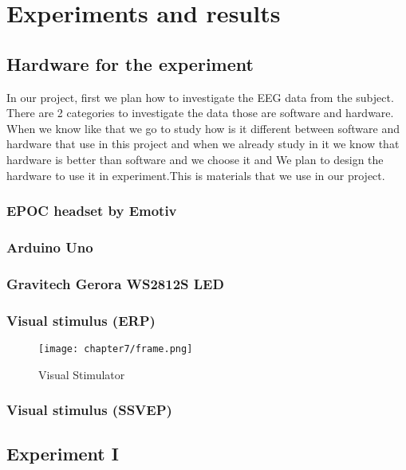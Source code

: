 \chapter{Experiments and results}

\label{ch:Experiments and results}

\setlength{\parindent}{4em}
\setlength{\parskip}{1em}
\renewcommand{\baselinestretch}{1.5}

\section{Hardware for the experiment}

In our project, first we plan how to investigate the EEG data from the subject. There are 2 categories to investigate the data those are software and hardware. When we know like that we go to study how is it different between software and hardware that use in this project and when we already study in it we know that hardware is better than software and we choose it and We plan to design the hardware to use it in experiment.This is materials that we use in our project.

\subsection{EPOC headset by Emotiv}

\subsection{Arduino Uno}

\subsection{Gravitech Gerora WS2812S LED}

\subsection{Visual stimulus (ERP)}
\begin{figure}[ht]
	\centering
	\texttt{[image: chapter7/frame.png]}
	\caption{Visual Stimulator}
\end{figure}
\subsection{Visual stimulus (SSVEP)}

\section{Experiment I}

